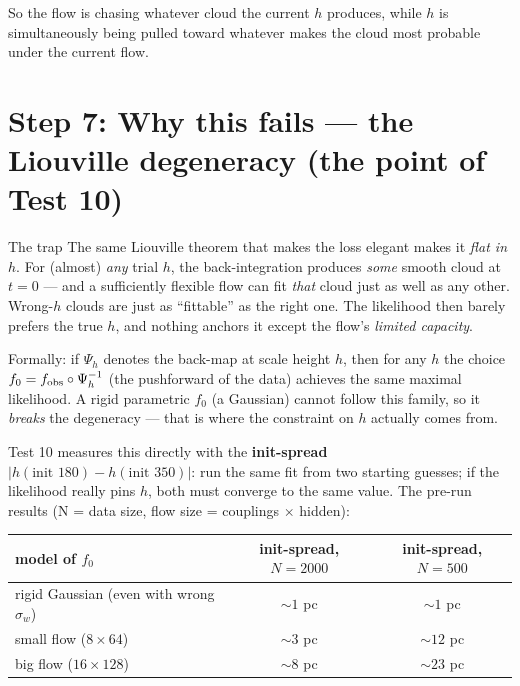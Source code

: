 \documentclass[11pt]{article}
\begin{document}
So the flow is chasing whatever cloud the current $h$ produces, while $h$ is
simultaneously being pulled toward whatever makes the cloud most probable under the
current flow.

\section{Step 7: Why this fails --- the Liouville degeneracy (the point of Test 10)}

\begin{warnbox}{The trap}
The same Liouville theorem that makes the loss elegant makes it \emph{flat in $h$}.
For (almost) \emph{any} trial $h$, the back-integration produces \emph{some} smooth
cloud at $t=0$ --- and a sufficiently flexible flow can fit \emph{that} cloud just as
well as any other. Wrong-$h$ clouds are just as ``fittable'' as the right one. The
likelihood then barely prefers the true $h$, and nothing anchors it except the flow's
\emph{limited capacity}.
\end{warnbox}

Formally: if $\Psi_h$ denotes the back-map at scale height $h$, then for any $h$ the
choice $f_0 = f_{\rm obs}\circ \Psi_h^{-1}$ (the pushforward of the data) achieves the
same maximal likelihood. A rigid parametric $f_0$ (a Gaussian) cannot follow this
family, so it \emph{breaks} the degeneracy --- that is where the constraint on $h$
actually comes from.

Test 10 measures this directly with the \textbf{init-spread}
$|h(\text{init }180) - h(\text{init }350)|$: run the same fit from two starting
guesses; if the likelihood really pins $h$, both must converge to the same value.
The pre-run results (N = data size, flow size = couplings $\times$ hidden):

\begin{center}
\begin{tabular}{l c c}
\textbf{model of $f_0$} & \textbf{init-spread, $N{=}2000$} & \textbf{init-spread, $N{=}500$} \\ \hline
rigid Gaussian (even with wrong $\sigma_w$) & $\sim 1$ pc & $\sim 1$ pc \\
small flow ($8\times64$) & $\sim 3$ pc & $\sim 12$ pc \\
big flow ($16\times128$) & $\sim 8$ pc & $\sim 23$ pc \\
\end{tabular}
\end{center}
\end{document}
